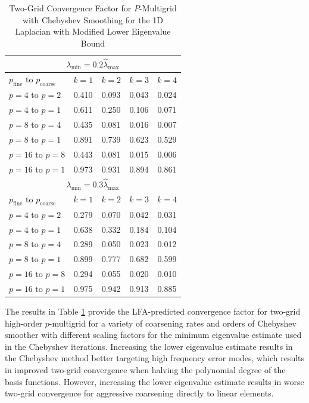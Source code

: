 \begin{table}[ht!]
\begin{center}
\begin{tabular}{l c c c c}
  \toprule
  \multicolumn{5}{c}{$\lambda_{\min} = 0.2 \hat{\lambda}_{\max}$} \\
  \toprule
  $p_{\text{fine}}$ to $p_{\text{coarse}}$  &  $k = 1$   &  $k = 2$   &  $k = 3$   &  $k = 4$   \\
  \toprule
  $p = 4$ to $p = 2$   &  0.410  &  0.093  &  0.043  &  0.024  \\
  $p = 4$ to $p = 1$   &  0.611  &  0.250  &  0.106  &  0.071  \\
  \midrule
  $p = 8$ to $p = 4$   &  0.435  &  0.081  &  0.016  &  0.007  \\
  $p = 8$ to $p = 1$   &  0.891  &  0.739  &  0.623  &  0.529  \\
  \midrule
  $p = 16$ to $p = 8$  &  0.443  &  0.081  &  0.015  &  0.006  \\
  $p = 16$ to $p = 1$  &  0.973  &  0.931  &  0.894  &  0.861  \\
  \toprule
  \multicolumn{5}{c}{$\lambda_{\min} = 0.3 \hat{\lambda}_{\max}$} \\
  \toprule
  $p_{\text{fine}}$ to $p_{\text{coarse}}$  &  $k = 1$   &  $k = 2$   &  $k = 3$   &  $k = 4$   \\
  \toprule
  $p = 4$ to $p = 2$   &  0.279  &  0.070  &  0.042  &  0.031  \\
  $p = 4$ to $p = 1$   &  0.638  &  0.332  &  0.184  &  0.104  \\
  \midrule
  $p = 8$ to $p = 4$   &  0.289  &  0.050  &  0.023  &  0.012  \\
  $p = 8$ to $p = 1$   &  0.899  &  0.777  &  0.682  &  0.599  \\
  \midrule
  $p = 16$ to $p = 8$  &  0.294  &  0.055  &  0.020  &  0.010  \\
  $p = 16$ to $p = 1$  &  0.975  &  0.942  &  0.913  &  0.885  \\
  \bottomrule
\end{tabular}
\end{center}
\caption{Two-Grid Convergence Factor for $P$-Multigrid with Chebyshev Smoothing for the 1D Laplacian with Modified Lower Eigenvalue Bound}
\label{table:two_grid_1d_chebyshev_eigenvalues}
\end{table}

The results in Table \ref{table:two_grid_1d_chebyshev_eigenvalues} provide the LFA-predicted convergence factor for two-grid high-order $p$-multigrid for a variety of coarsening rates and orders of Chebyshev smoother with different scaling factors for the minimum eigenvalue estimate used in the Chebyshev iterations.
Increasing the lower eigenvalue estimate results in the Chebyshev method better targeting high frequency error modes, which results in improved two-grid convergence when halving the polynomial degree of the basis functions.
However, increasing the lower eigenvalue estimate results in worse two-grid convergence for aggressive coarsening directly to linear elements.

